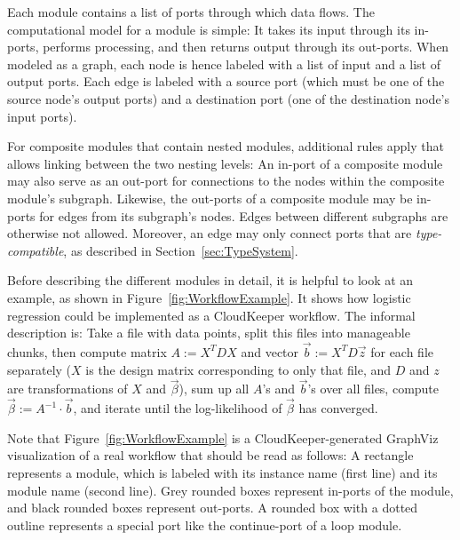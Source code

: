 Each module contains a list of ports through which data flows. The computational model for a module is simple: It takes its input through its in-ports, performs processing, and then returns output through its out-ports. When modeled as a graph, each node is hence labeled with a list of input and a list of output ports. Each edge is labeled with a source port (which must be one of the source node's output ports) and a destination port (one of the destination node's input ports).

For composite modules that contain nested modules, additional rules apply that allows linking between the two nesting levels: An in-port of a composite module may also serve as an out-port for connections to the nodes within the composite module's subgraph. Likewise, the out-ports of a composite module may be in-ports for edges from its subgraph's nodes. Edges between different subgraphs are otherwise not allowed. Moreover, an edge may only connect ports that are \emph{type-compatible}, as described in Section~\ref{sec:TypeSystem}.

\begin{example}
Before describing the different modules in detail, it is helpful to look at an example, as shown in Figure~\ref{fig:WorkflowExample}. It shows how logistic regression could be implemented as a CloudKeeper workflow. The informal description is: Take a file with data points, split this files into manageable chunks, then compute matrix $A := X^T D X$ and vector $\vec b := X^T D \vec z$ for each file separately ($X$ is the design matrix corresponding to only that file, and $D$ and $z$ are transformations of $X$ and $\vec \beta$), sum up all $A$'s and $\vec b$'s over all files, compute $\vec \beta := A^{-1} \cdot \vec b$, and iterate until the log-likelihood of $\vec \beta$ has converged.

Note that Figure~\ref{fig:WorkflowExample} is a CloudKeeper-generated GraphViz visualization of a real workflow that should be read as follows: A rectangle represents a module, which is labeled with its instance name (first line) and its module name (second line). Grey rounded boxes represent in-ports of the module, and black rounded boxes represent out-ports. A rounded box with a dotted outline represents a special port like the continue-port of a loop module.
\end{example}

